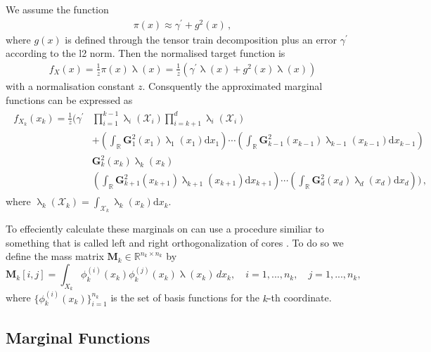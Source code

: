We assume the function
\begin{align}
	\pi(x) \approx \gamma^{\prime} + g^2(x) \, ,
\end{align} 
where $g(x)$ is defined through the tensor train decomposition plus an error $\gamma^{\prime}$  according to the l2 norm.
Then the normalised target function is 
\begin{align}
	f_X(x) = \frac{1}{z} \pi(x) \uplambda(x) = \frac{1}{z} ( \gamma^{\prime} \uplambda(x) + g^2(x) \uplambda(x))
\end{align} 
with a normalisation constant $z$.
Consquently the approximated marginal functions can be expressed as
\begin{align}
	\begin{split}
		f_{X_k}(x_k) = \frac{1}{z}  \Bigg( \gamma^{\prime}& \prod_{i=1}^{k-1} \uplambda_i(\mathcal{X}_i) \prod_{i=k+1}^{d} \uplambda_i(\mathcal{X}_i) \\&+  \left( \int_{\mathbb{R}} \bm{G}^2_{1}(x_1) \uplambda_1(x_1)\text{d}x_{1} \right) \cdots \left( \int_{\mathbb{R}} \bm{G}^2_{k-1}(x_{k-1}) \uplambda_{k-1}(x_{k-1}) \text{d}x_{k-1} \right) \\ & \bm{G}^2_{k}(x_k)\uplambda_k(x_{k})\\ & \left( \int_{\mathbb{R}}  \bm{G}^2_{k+1}(x_{k+1})\uplambda_{k+1}(x_{k+1})\text{d}x_{k+1} \right) \cdots  \left( \int_{\mathbb{R}} \bm{G}^2_{d}(x_d)\uplambda_d(x_{d})\text{d}x_d \right) \Bigg) \, ,
	\end{split} 
\end{align}
where $\uplambda_k( \mathcal{X}_k) = \int_{ \mathcal{X}_k} \uplambda_k (x_k) \text{d}x_k$.

To effeciently calculate these marginals on can use a procedure similiar to something that is called left and right orthogonalization of cores \cite{oseledets2011tensor}.
To do so we define the mass matrix $\bm{M}_k \in \mathbb{R}^{n_k \times n_k}$ by
\begin{equation}
	\bm{M}_k[i, j] = \int_{X_k} \phi^{(i)}_k(x_k) \phi^{(j)}_k(x_k)  \uplambda(x_k) \,dx_k, \quad i = 1, ..., n_k, \quad j = 1, ..., n_k,
\end{equation}
where $\{\phi^{(i)}_k(x_k)\}_{i=1}^{n_k}$ is the set of basis functions for the $k$-th coordinate.




\subsection{Marginal Functions}

